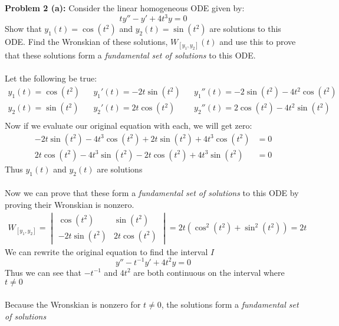 \documentclass[12pt]{article}
\begin{document}
\newpage 

\noindent \textbf{Problem 2 (a): } Consider the linear homogeneous ODE given by:
	$$
	ty'' - y' + 4t^3y = 0
	$$
Show that $y_1(t) = \cos(t^2)$ and $y_2(t) = \sin(t^2)$ are solutions to this ODE. Find the Wronskian of these solutions, $W_{[y_1, y_2]}(t)$ and use this to prove that these solutions form a \textit{fundamental set of solutions} to this ODE.
\\ \\
\noindent Let the following be true:
	\begin{align*}
		y_1(t) = \cos(t^2) && y_1'(t) = -2t\sin(t^2) && y_1''(t) = -2\sin(t^2) -4t^2\cos(t^2) \\
		y_2(t) = \sin(t^2) && y_2'(t) = 2t\cos(t^2) && y_2''(t) = 2\cos(t^2) - 4t^2\sin(t^2) \\
	\end{align*}
Now if we evaluate our original equation with each, we will get zero:
	\begin{align*}
		-2t\sin(t^2) -4t^3\cos(t^2) + 2t\sin(t^2) + 4t^3\cos(t^2) &= 0 \\
		2t\cos(t^2) - 4t^3\sin(t^2) - 2t\cos(t^2) + 4t^3\sin(t^2) &= 0
	\end{align*}
Thus $y_1(t)$ and $y_2(t)$ are solutions
\\ \\
Now we can prove that these form a \textit{fundamental set of solutions} to this ODE by proving their Wronskian is nonzero.
	\begin{align*}
		W_{[y_1,y_2]} = 
		\begin{vmatrix}
			\cos(t^2) & \sin(t^2) \\
			-2t\sin(t^2) & 2t\cos(t^2)
		\end{vmatrix}
		= 2t(\cos^2(t^2) + \sin^2(t^2)) = 2t
	\end{align*}
We can rewrite the original equation to find the interval $I$
	$$
	y'' - t^{-1}y' + 4t^2y = 0
	$$
Thus we can see that $-t^{-1}$ and $4t^2$ are both continuous on the interval where $t \not = 0$  
\\ \\
Because the Wronskian is nonzero for $t \not = 0$, the solutions form a \textit{fundamental set of solutions}

\newpage
\end{document}
